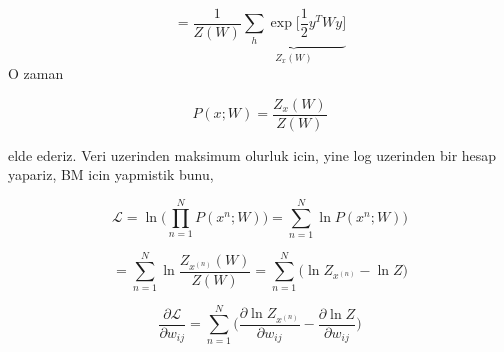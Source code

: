 \documentclass[12pt,fleqn]{article}\usepackage{../common}
\begin{document}
$$  
= \frac{1}{Z(W)}  
\underbrace{
\sum_h \exp 
\bigg[ 
\frac{1}{2} y^T W y
\bigg]
}_{Z_x(W)}
$$
O zaman 

$$  
P(x;W) = \frac{Z_x(W)}{Z(W)}  
$$

elde ederiz. Veri uzerinden maksimum olurluk icin, yine log uzerinden bir
hesap yapariz, BM icin yapmistik bunu,

$$  
\mathcal{L} = 
\ln \big( \prod_{n=1}^{N} P(x^{n};W) \big) = 
\sum_{n=1}^{N} \ln P(x^{n};W) \big) 
$$

$$ 
=  \sum_{n=1}^{N} \ln \frac{Z_{x^{(n)}}(W)}{Z(W)}  
= \sum_{n=1}^{N}  \big(\ln Z_{x^{(n)}} - \ln Z \big)
 $$


$$ 
\frac{\partial \mathcal{L} }{\partial w_{ij}} = 
 \sum_{n=1}^{N}  \big( \frac{\partial \ln Z_{x^{(n)}} }{\partial w_{ij}}
- \frac{\partial \ln Z }{\partial w_{ij}} \big)
$$
\end{document}
